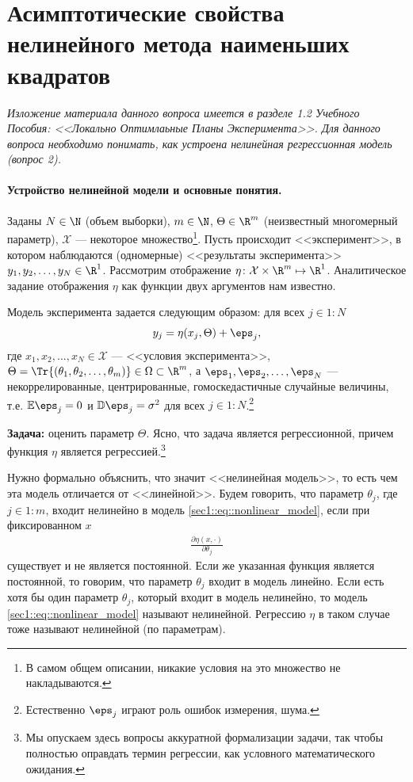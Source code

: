 \section{Асимптотические свойства нелинейного метода наименьших квадратов}

\textit{Изложение материала данного вопроса имеется в разделе 1.2 Учебного Пособия: <<Локально Оптимлаьные Планы Эксперимента>>.
        Для данного вопроса необходимо понимать, как устроена нелинейная регрессионная модель (вопрос 2).}

\paragraph{Устройство нелинейной модели и основные понятия.}
Заданы $N \in \N$ (объем выборки), $m \in \N$, $\Theta \in \R^m$ (неизвестный многомерный параметр), $\mathcal X$ --- некоторое множество\footnote{
    В самом общем описании, никакие условия на это множество не накладываются.
}.
Пусть происходит <<эксперимент>>, в котором наблюдаются (одномерные) <<результаты эксперимента>> $y_1, y_2, \ldots, y_N \in \R^1$.
Рассмотрим отображение $\eta \colon \mathcal X \times \R^m \mapsto \R^1$.
Аналитическое задание отображения $\eta$ как функции двух аргументов нам известно.

Модель эксперимента задается следующим образом: для всех $j \in 1:N$
\begin{gather}
    \label{sec1::eq::nonlinear_model}
    y_j = \eta(x_j, \Theta) + \eps_j,
\end{gather}
где $x_1, x_2, \ldots, x_N \in \mathcal X$ --- <<условия эксперимента>>, $\Theta = \Tr{(\theta_1, \theta_2, \ldots, \theta_m)} \in \Omega \subset \R^m$,
а $\eps_1, \eps_2, \ldots, \eps_N$ --- некоррелированные, центрированные, гомоскедастичные случайные величины, т.е.
$\mathbb E \eps_j = 0$ и $\mathbb D \eps_j = \sigma^2$ для всех $j \in 1:N$.\footnote{Естественно $\eps_j$ играют роль ошибок измерения, шума.}

\textbf{Задача:} оценить параметр $\Theta$.
Ясно, что задача является регрессионной, причем функция $\eta$ является регрессией.\footnote{Мы опускаем здесь вопросы аккуратной формализации
задачи, так чтобы полностью оправдать термин регрессии, как условного математического ожидания.}

Нужно формально объяснить, что значит <<нелинейная модель>>, то есть чем эта модель отличается от <<линейной>>.
Будем говорить, что параметр $\theta_j$, где $j \in 1:m$, входит нелинейно в модель \eqref{sec1::eq::nonlinear_model},
если при фиксированном $x$
\begin{gather*}
    \frac{\partial \eta(x, \cdot)}{\partial \theta_j}
\end{gather*}
существует и не является постоянной. Если же указанная функция является постоянной, то говорим, что параметр $\theta_j$ входит в модель линейно.
Если есть хотя бы один параметр $\theta_j$, который входит в модель нелинейно, то модель \eqref{sec1::eq::nonlinear_model} называют нелинейной.
Регрессию $\eta$ в таком случае тоже называют нелинейной (по параметрам).

